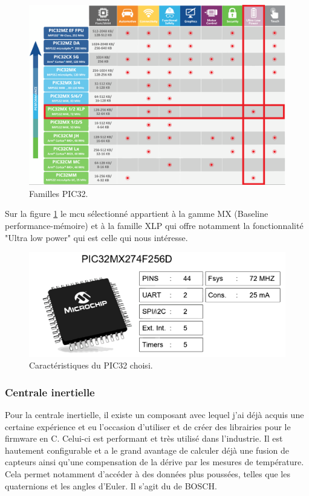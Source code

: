 \begin{figure}[h]
	\centering
	\includegraphics[width=0.65\linewidth]{../figures/pre_etude/familles_pic32}
	\caption{Familles PIC32.}
	\label{fig:famillespic32}
\end{figure}

Sur la figure \ref{fig:famillespic32} le \gls{mcu} sélectionné appartient à la gamme MX (Baseline performance-mémoire) et à la famille XLP qui offre notamment la fonctionnalité "Ultra low power" qui est celle qui nous intéresse.

\begin{figure}[h]
	\centering
	\includegraphics[width=0.7\linewidth]{../figures/pre_etude/Carac_PIC32}
	\caption{Caractéristiques du PIC32 choisi.}
	\label{fig:caracpic32}
\end{figure}

\clearpage
\subsubsection{Centrale inertielle} 
Pour la centrale inertielle, il existe un composant avec lequel j'ai déjà acquis une certaine expérience et eu l'occasion d'utiliser et de créer des librairies pour le firmware en C. Celui-ci est performant et très utilisé dans l'industrie. Il est hautement configurable et a le grand avantage de calculer déjà une fusion de capteurs ainsi qu'une compensation de la dérive par les mesures de température. Cela permet notamment d'accéder à des données plus poussées, telles que les quaternions et les angles d'Euler. Il s'agit du  de BOSCH.
 

